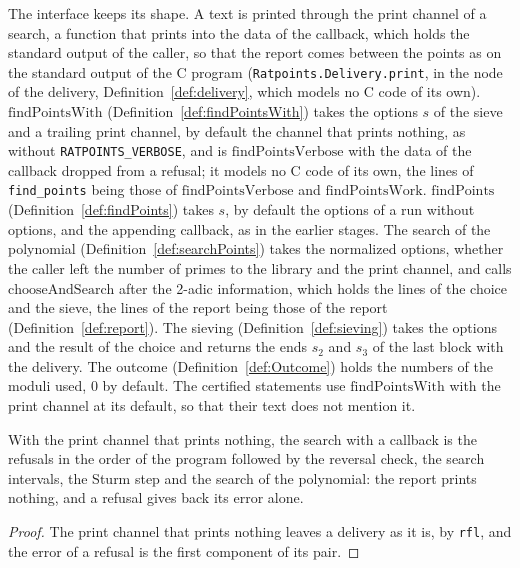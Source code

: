 The interface keeps its shape. A text is printed through the print channel of a search, a function
that prints into the data of the callback, which holds the standard output of the caller, so that
the report comes between the points as on the standard output of the C program
(\verb|Ratpoints.Delivery.print|, in the node of the delivery, Definition~\ref{def:delivery}, which
models no C code of its own). $\mathrm{findPointsWith}$ (Definition~\ref{def:findPointsWith}) takes
the options $s$ of the sieve and a trailing print channel, by default the channel that prints
nothing, as without \verb|RATPOINTS_VERBOSE|, and is $\mathrm{findPointsVerbose}$ with the data of
the callback dropped from a refusal; it models no C code of its own, the lines of \verb|find_points|
being those of $\mathrm{findPointsVerbose}$ and $\mathrm{findPointsWork}$. $\mathrm{findPoints}$
(Definition~\ref{def:findPoints}) takes $s$, by default the options of a run without options, and
the appending callback, as in the earlier stages. The search of the polynomial
(Definition~\ref{def:searchPoints}) takes the normalized options, whether the caller left the number
of primes to the library and the print channel, and calls $\mathrm{chooseAndSearch}$ after the
2-adic information, which holds the lines of the choice and the sieve, the lines of the report being
those of the report (Definition~\ref{def:report}). The sieving (Definition~\ref{def:sieving}) takes
the options and the result of the choice and returns the ends $s_2$ and $s_3$ of the last block with
the delivery. The outcome (Definition~\ref{def:Outcome}) holds the numbers of the moduli used, $0$
by default. The certified statements use $\mathrm{findPointsWith}$ with the print channel at its
default, so that their text does not mention it.

\begin{lemma}\label{lem:choiceSearch}
  \leanok
  With the print channel that prints nothing, the search with a callback is the refusals in the
  order of the program followed by the reversal check, the search intervals, the Sturm step and the
  search of the polynomial: the report prints nothing, and a refusal gives back its error alone.
\end{lemma}

\begin{proof}
  \leanok
  The print channel that prints nothing leaves a delivery as it is, by \verb|rfl|, and the error of
  a refusal is the first component of its pair.
\end{proof}


